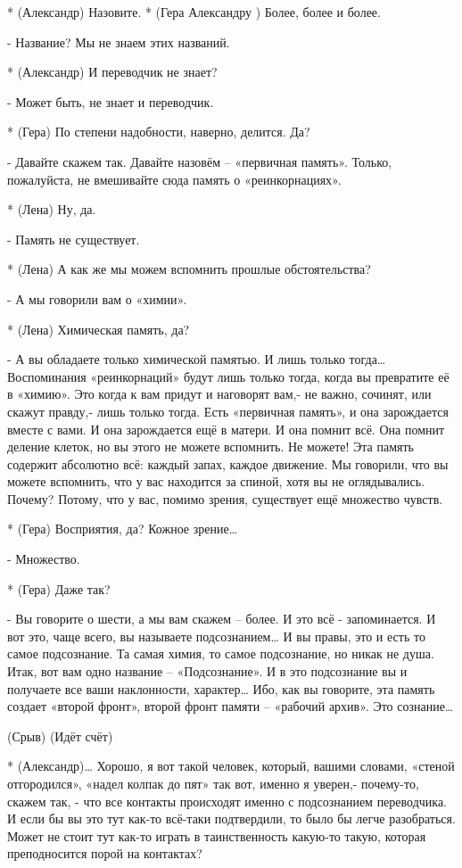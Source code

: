 * (Александр) Назовите.
* (Гера Александру ) Более, более и более.

- Название? Мы не знаем этих названий.

* (Александр) И переводчик не знает?

- Может быть, не знает и переводчик.

* (Гера) По степени надобности, наверно, делится. Да? 

- Давайте скажем так. Давайте назовём – «первичная память». Только, пожалуйста, не вмешивайте сюда память о «реинкорнациях».

* (Лена) Ну, да.

- Память не существует.

* (Лена) А как же мы можем вспомнить прошлые обстоятельства?

- А мы говорили вам о «химии».

* (Лена) Химическая память, да?

- А вы обладаете только химической памятью. И лишь только тогда… Воспоминания «реинкорнаций» будут лишь только тогда, когда вы превратите её в «химию». Это когда к вам придут и наговорят вам,- не важно, сочинят, или скажут правду,- лишь только тогда. Есть «первичная память», и она зарождается вместе с вами. И она зарождается ещё в матери. И она помнит всё. Она помнит деление клеток, но вы этого не можете вспомнить. Не можете! Эта память содержит абсолютно всё: каждый запах, каждое движение. Мы  говорили, что вы можете вспомнить, что у вас находится за спиной, хотя вы не оглядывались. Почему? Потому, что у вас, помимо зрения, существует ещё множество чувств.

* (Гера) Восприятия, да? Кожное зрение…

- Множество.

* (Гера) Даже так?

- Вы говорите о шести, а мы вам скажем – более. И это всё - запоминается. И вот это, чаще всего, вы называете подсознанием… И вы правы, это и есть то самое подсознание. Та самая химия, то самое подсознание, но никак не душа. Итак, вот вам одно название – «Подсознание». И в это подсознание вы и получаете все ваши наклонности, характер… Ибо, как вы говорите, эта память создает «второй фронт», второй  фронт памяти – «рабочий архив». Это сознание…

(Срыв)
(Идёт счёт)

* (Александр)… Хорошо, я вот такой человек, который, вашими словами, «стеной отгородился», «надел колпак до пят» так вот, именно я  уверен,- почему-то, скажем так, - что все контакты происходят именно с подсознанием переводчика. И если бы вы это тут как-то всё-таки подтвердили, то было бы легче разобраться. Может не стоит тут как-то играть в таинственность какую-то такую, которая преподносится порой на контактах?

